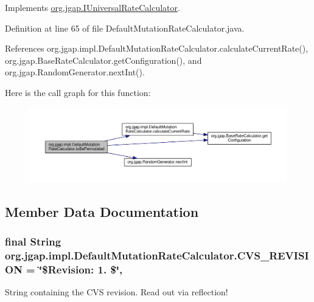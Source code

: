 Implements \hyperlink{interfaceorg_1_1jgap_1_1_i_universal_rate_calculator_aa2e90d38b67668a3bbf80820293269c0}{org.\-jgap.\-I\-Universal\-Rate\-Calculator}.



Definition at line 65 of file Default\-Mutation\-Rate\-Calculator.\-java.



References org.\-jgap.\-impl.\-Default\-Mutation\-Rate\-Calculator.\-calculate\-Current\-Rate(), org.\-jgap.\-Base\-Rate\-Calculator.\-get\-Configuration(), and org.\-jgap.\-Random\-Generator.\-next\-Int().



Here is the call graph for this function\-:
\nopagebreak
\begin{figure}[H]
\begin{center}
\leavevmode
\includegraphics[width=350pt]{classorg_1_1jgap_1_1impl_1_1_default_mutation_rate_calculator_a795b836f85740742f5a88860915a3ff4_cgraph}
\end{center}
\end{figure}




\subsection{Member Data Documentation}
\hypertarget{classorg_1_1jgap_1_1impl_1_1_default_mutation_rate_calculator_a451bf1123dd7668fd403793f6069cb56}{
\subsubsection[{C\-V\-S\-\_\-\-R\-E\-V\-I\-S\-I\-O\-N}]{\setlength{\rightskip}{0pt plus 5cm}final String org.\-jgap.\-impl.\-Default\-Mutation\-Rate\-Calculator.\-C\-V\-S\-\_\-\-R\-E\-V\-I\-S\-I\-O\-N = \char`\"{}\$Revision\-: 1. \$\char`\"{}\hspace{0.3cm}{\ttfamily [static]}, {\ttfamily [private]}}}\label{classorg_1_1jgap_1_1impl_1_1_default_mutation_rate_calculator_a451bf1123dd7668fd403793f6069cb56}
String containing the C\-V\-S revision. Read out via reflection! 

